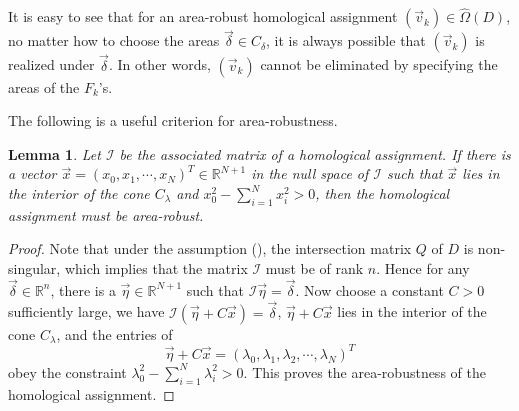 \documentclass[11pt]{amsart}
\theoremstyle{plain}
\numberwithin{theorem}{section}
\newtheorem{lemma}[theorem]{Lemma}
\theoremstyle{definition}
\newcommand{\R}{{\mathbb R}}
\newcommand{\I}{{\mathcal I}}
\begin{document}
It is easy to see that for an area-robust homological assignment $(\vec{v}_k)\in\hat{\Omega}(D)$, no matter how to choose the areas $\vec{\delta}\in {C}_\delta$, it is always possible that $(\vec{v}_k)$ is realized under 
$\vec{\delta}$. In other words, $(\vec{v}_k)$ cannot be eliminated by specifying the areas of the $F_k$'s. 

The following is a useful criterion for area-robustness. 

\begin{lemma}
Let $\I$ be the associated matrix of a homological assignment. If there is a vector 
$\vec{x}=(x_0,x_1,\cdots,x_N)^T\in \R^{N+1}$ in the null space of $\I$ such that $\vec{x}$ lies in the interior of the cone $C_\lambda$ and $x_0^2-\sum_{i=1}^N x_i^2>0$, then the homological assignment must be area-robust. 
\end{lemma}

\begin{proof}
Note that under the assumption (\ddag), the intersection matrix $Q$ of $D$ is non-singular, which implies that the matrix $\I$ must be of rank $n$. Hence for any $\vec{\delta}\in\R^n$, there is a $\vec{\eta}\in \R^{N+1}$ such that
$\I\vec{\eta}=\vec{\delta}$. Now choose a constant $C>0$ sufficiently large, we have 
$\I(\vec{\eta}+C\vec{x})=\vec{\delta}$, $\vec{\eta}+C\vec{x}$ lies in the interior of
the cone $C_\lambda$, and the entries of 
$$
\vec{\eta}+C\vec{x}=(\lambda_0,\lambda_1,\lambda_2,\cdots,\lambda_N)^T
$$ 
obey the constraint $\lambda_0^2-\sum_{i=1}^N\lambda_i^2>0$. This proves the area-robustness of the homological assignment. 

\end{proof}
\end{document}
